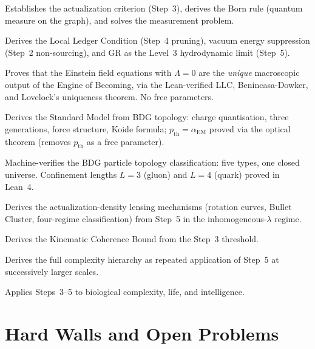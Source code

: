 \documentclass[11pt,a4paper]{article}
\theoremstyle{plain}
\theoremstyle{definition}
\theoremstyle{remark}
\begin{document}
\begin{description}[leftmargin=1.5em]
  \item[\textbf{RAQM}~\citep{Sandeman2026a}] Establishes the actualization
  criterion (Step~3), derives the Born rule (quantum measure on the graph),
  and solves the measurement problem.
  \item[\textbf{RAGC}~\citep{Sandeman2026b}] Derives the Local Ledger
  Condition (Step~4 pruning), vacuum energy suppression (Step~2 non-sourcing),
  and GR as the Level~3 hydrodynamic limit (Step~5).
  \item[\textbf{RACL}~\citep{Sandeman2026RACL}] Proves that the Einstein field
  equations with $\Lambda=0$ are the \emph{unique} macroscopic output of the
  Engine of Becoming, via the Lean-verified LLC, Benincasa-Dowker, and
  Lovelock's uniqueness theorem. No free parameters.
  \item[\textbf{RASM}~\citep{Sandeman2026RASM}] Derives the Standard Model
  from BDG topology: charge quantisation, three generations, force structure,
  Koide formula; $p_{\mathrm{th}} = \alpha_{\mathrm{EM}}$ proved via the
  optical theorem (removes $p_{\mathrm{th}}$ as a free parameter).
  \item[\textbf{RATM}~\citep{Sandeman2026RATM}] Machine-verifies the BDG
  particle topology classification: five types, one closed universe.
  Confinement lengths $L{=}3$ (gluon) and $L{=}4$ (quark) proved in Lean~4.
  \item[\textbf{RADM}~\citep{Sandeman2026RADM}] Derives the actualization-density lensing mechanisms (rotation curves, Bullet Cluster, four-regime classification)
  from Step~5 in the inhomogeneous-$\lambda$ regime.
  \item[\textbf{RAQI}~\citep{Sandeman2026d}] Derives the Kinematic Coherence
  Bound from the Step~3 threshold.
  \item[\textbf{RAHC}~\citep{Sandeman2026RAHC}] Derives the full complexity
  hierarchy as repeated application of Step~5 at successively larger scales.
  \item[\textbf{RACI}~\citep{Sandeman2026c}] Applies Steps~3--5 to biological
  complexity, life, and intelligence.
\end{description}

\section{Hard Walls and Open Problems}
\label{sec:hardwalls}
\end{document}
